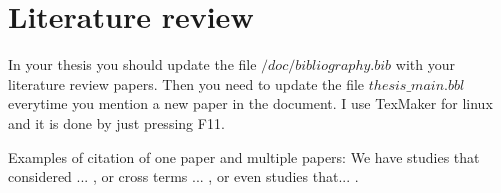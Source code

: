 \chapter{Literature review} \label{chap:lit}


In your thesis you should update the file $/doc/bibliography.bib$ with your literature review papers.
Then you need to update the file $thesis\_main.bbl$ everytime you mention a new paper in the document.
I use TexMaker for linux and it is done by just pressing F11.

Examples of citation of one paper and multiple papers: We have studies that considered ... \cite{lim}, or cross terms ... \cite{luo}, or even studies that... \cite{liu,li2003,zhu2005}.
